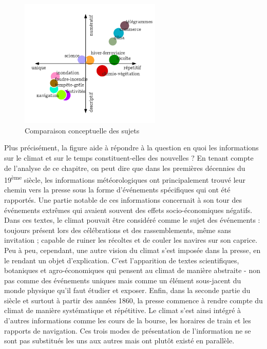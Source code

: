 \documentclass[a4paper,twoside,12pt]{article}
\begin{document}
\begin{figure}
  \begin{center}
    \includegraphics[width=0.6\textwidth, frame]{images/conceptual_scatterplot.pdf}
  \end{center}
  \vspace*{-2ex}
  \captionsetup{justification=centering}
  \caption{Comparaison conceptuelle des sujets}
  \label{fig:conceptual_scatterplot}
\end{figure}

Plus précisément, la figure aide à répondre à la question \og en quoi les informations sur le climat et sur le temps constituent-elles des nouvelles ? \fg{} En tenant compte de l'analyse de ce chapitre, on peut dire que dans les premières décennies du 19\textsuperscript{ème} siècle, les informations météorologiques ont principalement trouvé leur chemin vers la presse sous la forme d'événements spécifiques qui ont été rapportés. Une partie notable de ces informations concernait à son tour des événements extrêmes qui avaient souvent des effets socio-économiques négatifs. Dans ces textes, le climat pouvait être considéré comme le sujet des événements : toujours présent lors des célébrations et des rassemblements, même sans invitation ; capable de ruiner les récoltes et de couler les navires sur son caprice. Peu à peu, cependant, une autre vision du climat s'est imposée dans la presse, en le rendant un objet d'explication. C'est l'apparition de textes scientifiques, botaniques et agro-économiques qui pensent au climat de manière abstraite - non pas comme des événements uniques mais comme un élément sous-jacent du monde physique qu'il faut étudier et exposer. Enfin, dans la seconde partie du siècle et surtout à partir des années 1860, la presse commence à rendre compte du climat de manière systématique et répétitive. Le climat s'est ainsi intégré à d'autres informations comme les cours de la bourse, les horaires de train et les rapports de navigation. Ces trois modes de présentation de l'information ne se sont pas substitués les uns aux autres mais ont plutôt existé en parallèle.
\end{document}
